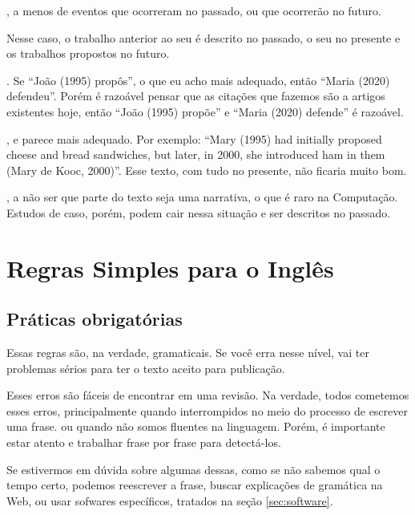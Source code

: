 \documentclass[openany]{book}
\begin{document}
, a menos de eventos que ocorreram no passado, ou que ocorrerão no futuro.

 Nesse caso, o trabalho anterior ao seu é descrito no passado, o seu no presente e os trabalhos propostos no futuro.

. Se ``João (1995) propôs'', o que eu acho mais adequado, então ``Maria (2020) defendeu''. Porém é razoável pensar que as citações que fazemos são a artigos existentes hoje, então ``João (1995) propõe'' e ``Maria (2020) defende'' é razoável.

, e parece mais adequado. Por exemplo: ``Mary (1995) had initially proposed cheese and bread sandwiches, but later, in 2000, she introduced ham in them (Mary de Kooc, 2000)''. Esse texto, com tudo no presente, não ficaria muito bom.

, a não ser que parte do texto seja uma narrativa, o que é raro na Computação. Estudos de caso, porém, podem cair nessa situação e ser descritos no passado.

\chapter{Regras Simples para o Inglês}

\section{Práticas obrigatórias}

Essas regras são, na verdade, gramaticais. Se você erra nesse nível, vai ter problemas sérios para ter o texto aceito para publicação.

Esses erros são fáceis de encontrar em uma revisão. Na verdade, todos cometemos esses erros, principalmente quando interrompidos no meio do processo de escrever uma frase. ou quando não somos fluentes na linguagem. Porém, é importante estar atento e trabalhar frase por frase para detectá-los.

Se estivermos em dúvida sobre algumas dessas, como se não sabemos qual o tempo certo, podemos reescrever a frase, buscar explicações de gramática na Web, ou usar sofwares específicos, tratados na seção \ref{sec:software}.
\end{document}
